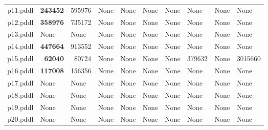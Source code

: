 \documentclass{article}
\begin{document}
\begin{tabular}{@{}lrrrrrrrrr@{}}
p11.pddl & \textbf{243452} & 595976 & \multicolumn{1}{|l|}{None} & \multicolumn{1}{|l|}{None} & \multicolumn{1}{|l|}{None} & \multicolumn{1}{|l|}{None} & \multicolumn{1}{|l|}{None} & \multicolumn{1}{|l|}{None} & \multicolumn{1}{|l|}{None} \\
p12.pddl & \textbf{358976} & 735172 & \multicolumn{1}{|l|}{None} & \multicolumn{1}{|l|}{None} & \multicolumn{1}{|l|}{None} & \multicolumn{1}{|l|}{None} & \multicolumn{1}{|l|}{None} & \multicolumn{1}{|l|}{None} & \multicolumn{1}{|l|}{None} \\
p13.pddl & \multicolumn{1}{|l|}{None} & \multicolumn{1}{|l|}{None} & \multicolumn{1}{|l|}{None} & \multicolumn{1}{|l|}{None} & \multicolumn{1}{|l|}{None} & \multicolumn{1}{|l|}{None} & \multicolumn{1}{|l|}{None} & \multicolumn{1}{|l|}{None} & \multicolumn{1}{|l|}{None} \\
p14.pddl & \textbf{447664} & 913552 & \multicolumn{1}{|l|}{None} & \multicolumn{1}{|l|}{None} & \multicolumn{1}{|l|}{None} & \multicolumn{1}{|l|}{None} & \multicolumn{1}{|l|}{None} & \multicolumn{1}{|l|}{None} & \multicolumn{1}{|l|}{None} \\
p15.pddl & \textbf{62040} & 80724 & \multicolumn{1}{|l|}{None} & \multicolumn{1}{|l|}{None} & \multicolumn{1}{|l|}{None} & \multicolumn{1}{|l|}{None} & 379632 & \multicolumn{1}{|l|}{None} & 3015660 \\
p16.pddl & \textbf{117008} & 156356 & \multicolumn{1}{|l|}{None} & \multicolumn{1}{|l|}{None} & \multicolumn{1}{|l|}{None} & \multicolumn{1}{|l|}{None} & \multicolumn{1}{|l|}{None} & \multicolumn{1}{|l|}{None} & \multicolumn{1}{|l|}{None} \\
p17.pddl & \multicolumn{1}{|l|}{None} & \multicolumn{1}{|l|}{None} & \multicolumn{1}{|l|}{None} & \multicolumn{1}{|l|}{None} & \multicolumn{1}{|l|}{None} & \multicolumn{1}{|l|}{None} & \multicolumn{1}{|l|}{None} & \multicolumn{1}{|l|}{None} & \multicolumn{1}{|l|}{None} \\
p18.pddl & \multicolumn{1}{|l|}{None} & \multicolumn{1}{|l|}{None} & \multicolumn{1}{|l|}{None} & \multicolumn{1}{|l|}{None} & \multicolumn{1}{|l|}{None} & \multicolumn{1}{|l|}{None} & \multicolumn{1}{|l|}{None} & \multicolumn{1}{|l|}{None} & \multicolumn{1}{|l|}{None} \\
p19.pddl & \multicolumn{1}{|l|}{None} & \multicolumn{1}{|l|}{None} & \multicolumn{1}{|l|}{None} & \multicolumn{1}{|l|}{None} & \multicolumn{1}{|l|}{None} & \multicolumn{1}{|l|}{None} & \multicolumn{1}{|l|}{None} & \multicolumn{1}{|l|}{None} & \multicolumn{1}{|l|}{None} \\
p20.pddl & \multicolumn{1}{|l|}{None} & \multicolumn{1}{|l|}{None} & \multicolumn{1}{|l|}{None} & \multicolumn{1}{|l|}{None} & \multicolumn{1}{|l|}{None} & \multicolumn{1}{|l|}{None} & \multicolumn{1}{|l|}{None} & \multicolumn{1}{|l|}{None} & \multicolumn{1}{|l|}{None} \\
\end{tabular}
\end{document}
